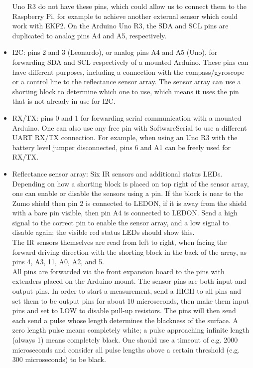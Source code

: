 \documentclass{article}
\begin{document}
\begin{itemize}
        Uno R3 do not have these pins, which could allow us to connect them to 
        the Raspberry Pi, for example to achieve another external sensor which 
        could work with EKF2. On the Arduino Uno R3, the SDA and SCL pins are 
        duplicated to analog pins A4 and A5, respectively.
  \item I2C: pins 2 and 3 (Leonardo), or analog pins A4 and A5 (Uno), for 
        forwarding SDA and SCL respectively of a mounted Arduino. These pins 
        can have different purposes, including a connection with the 
        compass/gyroscope or a control line to the reflectance sensor array. 
        The sensor array can use a shorting block to determine which one to 
        use, which means it uses the pin that is not already in use for I2C.
  \item RX/TX: pins 0 and 1 for forwarding serial communication with a mounted 
        Arduino. One can also use any free pin with SoftwareSerial to use 
        a different UART RX/TX connection. For example, when using an Uno R3 
        with the battery level jumper disconnected, pins 6 and A1 can be freely 
        used for RX/TX.
  \item Reflectance sensor array: Six IR sensors and additional status LEDs. 
        Depending on how a shorting block is placed on top right of the sensor 
        array, one can enable or disable the sensors using a pin. If the block 
        is near to the Zumo shield then pin 2 is connected to LEDON, if it is 
        away from the shield with a bare pin visible, then pin A4 is connected 
        to LEDON. Send a high signal to the correct pin to enable the sensor 
        array, and a low signal to disable again; the visible red status LEDs 
        should show this. \\
        The IR sensors themselves are read from left to right, when facing the 
        forward driving direction with the shorting block in the back of the 
        array, as pins 4, A3, 11, A0, A2, and 5. \\
        All pins are forwarded via the front expansion board to the pins with 
        extenders placed on the Arduino mount. The sensor pins are both input 
        and output pins. In order to start a measurement, send a HIGH to all 
        pins and set them to be output pins for about 10 microseconds, then 
        make them input pins and set to LOW to disable pull-up resistors. The 
        pins will then send each send a pulse whose length determines the 
        blackness of the surface. A zero length pulse means completely white; 
        a pulse approaching infinite length (always 1) means completely black. 
        One should use a timeout of e.g. 2000 microseconds and consider all 
        pulse lengths above a certain threshold (e.g. 300 microseconds) to be 
        black.
\end{itemize}  
\end{document}
